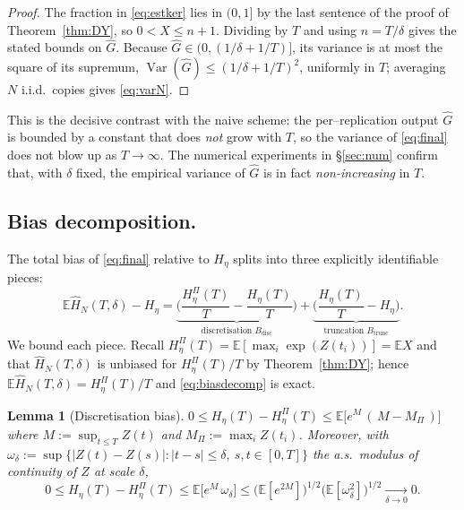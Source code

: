 \documentclass{amsart}
\newtheorem{lemma}{Lemma}
\theoremstyle{definition}
\DeclareMathOperator{\Var}{Var}
\newcommand{\E}{\mathbb{E}}
\begin{document}
\begin{proof}
The fraction in \eqref{eq:estker} lies in $(0,1]$ by the last sentence of the
proof of Theorem~\ref{thm:DY}, so $0<X\le n+1$. Dividing by $T$ and using
$n=T/\delta$ gives the stated bounds on $\widehat G$.
Because $\widehat G\in(0,(1/\delta+1/T)]$, its variance is at most the square of
its supremum, $\Var(\widehat G)\le(1/\delta+1/T)^2$, uniformly in $T$; averaging
$N$ i.i.d.\ copies gives \eqref{eq:varN}.
\end{proof}

This is the decisive contrast with the naive scheme: the per--replication output
$\widehat G$ is bounded by a constant that does \emph{not} grow with $T$, so the
variance of \eqref{eq:final} does not blow up as $T\to\infty$. The numerical
experiments in \S\ref{sec:num} confirm that, with $\delta$ fixed, the empirical
variance of $\widehat G$ is in fact \emph{non-increasing} in $T$.

\subsection{Bias decomposition.}

The total bias of \eqref{eq:final} relative to $H_\eta$ splits into three
explicitly identifiable pieces:
\begin{equation}\label{eq:biasdecomp}
   \E\widehat H_N(T,\delta)-H_\eta
   =\underbrace{\Big(\frac{H_\eta^{\Pi}(T)}{T}-\frac{H_\eta(T)}{T}\Big)}_{\text{discretisation }B_{\mathrm{disc}}}
   +\underbrace{\Big(\frac{H_\eta(T)}{T}-H_\eta\Big)}_{\text{truncation }B_{\mathrm{trunc}}} .
\end{equation}
We bound each piece. Recall $H_\eta^{\Pi}(T)=\E[\max_i\exp(Z(t_i))]=\E X$ and that
$\widehat H_N(T,\delta)$ is unbiased for $H_\eta^{\Pi}(T)/T$ by
Theorem~\ref{thm:DY}; hence $\E\widehat H_N(T,\delta)=H_\eta^{\Pi}(T)/T$ and
\eqref{eq:biasdecomp} is exact.

\begin{lemma}[Discretisation bias]\label{lem:disc}
$0\le H_\eta(T)-H_\eta^{\Pi}(T)\le \E\big[e^{M}\,(\,M-M_\Pi\,)\big]$ where
$M:=\sup_{t\le T}Z(t)$ and $M_\Pi:=\max_i Z(t_i)$.
Moreover, with $\omega_\delta:=\sup\{|Z(t)-Z(s)|:|t-s|\le\delta,\ s,t\in[0,T]\}$
the a.s.\ modulus of continuity of $Z$ at scale $\delta$,
\[
   0\le H_\eta(T)-H_\eta^{\Pi}(T)\le \E\big[e^{M}\,\omega_\delta\big]
   \le \big(\E[e^{2M}]\big)^{1/2}\big(\E[\omega_\delta^2]\big)^{1/2}\xrightarrow[\delta\to0]{}0 .
\]
\end{lemma}
\end{document}
